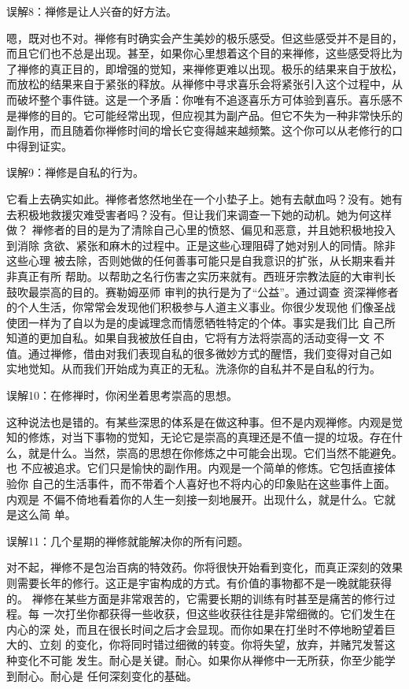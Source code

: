 \subsectnon 误解8：禅修是让人兴奋的好方法。

嗯，既对也不对。禅修有时确实会产生美妙的极乐感受。但这些感受并不是目的，
而且它们也不总是出现。甚至，如果你心里想着这个目的来禅修，这些感受将比为
了禅修的真正目的，即增强的觉知，来禅修更难以出现。极乐的结果来自于放松，
而放松的结果来自于紧张的释放。从禅修中寻求喜乐会将紧张引入这个过程中，从
而破坏整个事件链。这是一个矛盾：你唯有不追逐喜乐方可体验到喜乐。喜乐感不
是禅修的目的。它可能经常出现，但应视其为副产品。但它不失为一种非常快乐的
副作用，而且随着你禅修时间的增长它变得越来越频繁。这个你可以从老修行的口
中得到证实。

\subsectnon 误解9：禅修是自私的行为。

它看上去确实如此。禅修者悠然地坐在一个小垫子上。她有去献血吗？没有。她有
去积极地救援灾难受害者吗？没有。但让我们来调查一下她的动机。她为何这样做？
禅修者的目的是为了清除自己心里的愤怒、偏见和恶意，并且她积极地投入到消除
贪欲、紧张和麻木的过程中。\1正是这些心理阻碍了她对别人的同情。除非这些心理
被去除，否则她做的任何善事可能只是自我意识的扩张，从长期来看并非真正有所
帮助。以帮助之名行伤害之实历来就有。西班牙宗教法庭的大审判长鼓吹最崇高的目的。赛勒姆巫师
审判的执行是为了“公益”。通过调查
资深禅修者的个人生活，你常常会发现他们积极参与人道主义事业。你很少发现他
们像圣战使团一样为了自以为是的虔诚理念而情愿牺牲特定的个体。事实是我们比
自己所知道的更加自私。如果自我被放任自由，它将有方法将崇高的活动变得一文
不值。通过禅修，借由对我们表现自私的很多微妙方式的醒悟，我们变得对自己如
实地觉知。从而我们开始成为真正的无私。洗涤你的自私并不是自私的行为。

\subsectnon 误解10：在修禅时，你闲坐着思考崇高的思想。

这种说法也是错的。有某些深思的体系是在做这种事。但不是内观禅修。内观是觉
知的修炼，对当下事物的觉知，无论它是崇高的真理还是不值一提的垃圾。存在什
么，就是什么。当然，崇高的思想在你修炼之中可能会出现。它们当然不能避免。也
不应被追求。它们只是愉快的副作用。内观是一个简单的修炼。它包括直接体验你
自己的生活事件，而不带着个人喜好也不将内心的印象贴在这些事件上面。内观是
不偏不倚地看着你的人生一刻接一刻地展开。出现什么，就是什么。它就是这么简
单。

\subsectnon \1误解11：几个星期的禅修就能解决你的所有问题。

对不起，禅修不是包治百病的特效药。你将很快开始看到变化，而真正深刻的效果
则需要长年的修行。这正是宇宙构成的方式。有价值的事物都不是一晚就能获得的。
禅修在某些方面是非常艰苦的，它需要长期的训练有时甚至是痛苦的修行过程。每
一次打坐你都获得一些收获，但这些收获往往是非常细微的。它们发生在内心的深
处，而且在很长时间之后才会显现。而你如果在打坐时不停地盼望着巨大的、立刻
的变化，你将同时错过细微的转变。你将失望，放弃，并赌咒发誓这种变化不可能
发生。耐心是关键。耐心。如果你从禅修中一无所获，你至少能学到耐心。耐心是
任何深刻变化的基础。

\endchapter

\byebye
